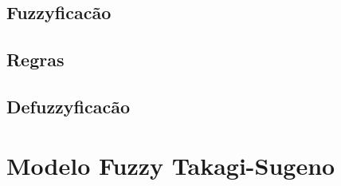 \subsection{Fuzzyficacão}

\subsection{Regras}
	\subsection{Defuzzyficacão}


\section{Modelo Fuzzy Takagi-Sugeno}


%


